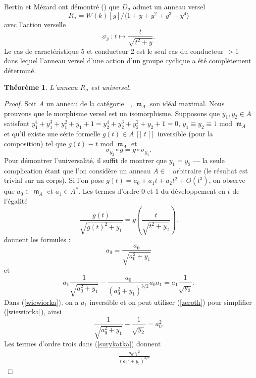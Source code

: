 \documentclass[11pt]{amsart}
\newtheorem*{thm}{Th\'eor\`eme}
\DeclareMathOperator{\maks}{\mathfrak{m}}
\DeclareMathOperator{\kate}{\mathsf{Art}_{\mathit k}}
\DeclareMathOperator{\psl}{\![\![\!}
\DeclareMathOperator{\psr}{\!]\!]}
\begin{document}
Bertin et M\'ezard ont d\'emontr\'e (\cite[Th\'eor\`eme 4.2.8]{BM}) que $D_{\sigma}$ admet un anneau versel 
$$ R_\sigma = W(k)[y]/\langle 1+y+y^2+y^3+y^4 \rangle $$ avec l'action verselle 
$$ \sigma_y \, : \, t \mapsto \frac{t}{\sqrt{t^2+y}}. $$ Le cas de caract\'eristique 5 et conducteur 2 est le seul cas du conducteur $>1 $ dans lequel l'anneau versel d'une action d'un groupe cyclique a \'et\'e compl\`etement d\'etermin\'e.

\begin{thm}
L'anneau $R_\sigma$ est \emph{uni}versel. 
\end{thm}

\begin{proof}
Soit $A$ un anneau de la cat\'egorie $\kate$, $\maks_A$ son id\'eal maximal. Nous prouvons que le morphisme versel est un isomorphisme. Supposons que $y_1,y_2 \in A$ satisfont $y_1^4+y_1^3+y_1^2+y_1+1=y_2^4+y_2^3+y_2^2+y_2+1=0$, $y_1 \equiv y_2 \equiv 1 \mbox{ mod }\maks_A$ et qu'il existe une s\'erie formelle $g(t)\in A\psl t \psr$ inversible (pour la composition) tel que $g(t) \equiv t \mbox{ mod } \maks_A$ et
$$ \sigma_{y_2} \circ g = g \circ \sigma_{y_1}. $$
Pour d\'emontrer l'universalit\'e, il suffit de montrer que $y_1=y_2$ --- la seule complication \'etant que l'on consid\`ere un anneau $A \in \kate$ arbitraire (le r\'esultat est trivial sur un corps). Si l'on pose $g(t)=a_0+a_1t+a_2t^2+O(t^3)$, on observe que $a_0 \in \maks_A$ et $a_1 \in A^*$. Les termes d'ordre 0 et 1 du d\'eveloppement en $t$ de l'\'egalit\'e 
\begin{equation}\label{surykatka} \frac{g(t)}{\sqrt{g(t)^2+y_1}} = g\left(\frac{t}{\sqrt{t^2+y_2}}\right). \end{equation}
donnent les formules :
\begin{equation} \label{zeroth}
a_0 = \frac{a_0}{\sqrt{a_0^2+y_1}} 
\end{equation}
et
\begin{equation} \label{wiewiorka} a_1 \frac{1}{\sqrt{a_0^2+y_1}}-\frac{a_0}{(a_0^2+y_1)^{3/2}}a_0a_1 = a_1 \frac{1}{\sqrt{y_2}}. \end{equation}
Dans (\ref{wiewiorka}), on a $a_1$ inversible et on peut utiliser (\ref{zeroth}) pour simplifier (\ref{wiewiorka}), ainsi \begin{equation} \label{first} \frac{1}{\sqrt{a_0^2+y_1}}-\frac{1}{\sqrt{y_2}}=a_0^2. \end{equation}
Les termes d'ordre trois dans (\ref{surykatka}) donnent
\begin{eqnarray*}
 & & \frac{{a_0}  {a_1}^2}{\left({a_0   }^2+{y_1}\right)^{3/2}}  

\end{eqnarray*}
\end{proof}
\end{document}
